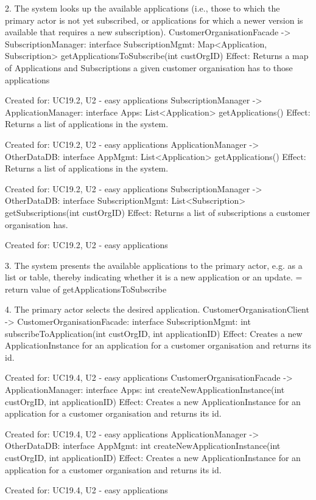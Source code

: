 {{{            2. The system looks up the available applications (i.e., those to which the primary actor is not yet subscribed,
               or applications for which a newer version is available that requires a new subscription).
                    CustomerOrganisationFacade -> SubscriptionManager: interface SubscriptionMgmt: Map<Application, Subscription> getApplicationsToSubscribe(int custOrgID)
                        Effect: Returns a map of Applications and Subscriptions a given customer organisation has to those applications
                        \item Created for: UC19.2, U2 - easy applications
                    SubscriptionManager -> ApplicationManager:            interface Apps:             List<Application> getApplications()
                        Effect: Returns a list of applications in the system.
                        \item Created for: UC19.2, U2 - easy applications
                    ApplicationManager -> OtherDataDB:                    interface AppMgmt:          List<Application> getApplications()
                        Effect: Returns a list of applications in the system.
                        \item Created for: UC19.2, U2 - easy applications
                    SubscriptionManager -> OtherDataDB:                   interface SubscriptionMgmt: List<Subscription> getSubscriptions(int custOrgID)
                        Effect: Returns a list of subscriptions a customer organisation has.
                        \item Created for: UC19.2, U2 - easy applications

            3. The system presents the available applications to the primary actor, e.g. as a list or table,
               thereby indicating whether it is a new application or an update.
                    = return value of getApplicationsToSubscribe

            4. The primary actor selects the desired application.
                    CustomerOrganisationClient -> CustomerOrganisationFacade: interface SubscriptionMgmt: int subscribeToApplication(int custOrgID, int applicationID)
                        Effect: Creates a new ApplicationInstance for an application for a customer organisation and returns its id.
                        \item Created for: UC19.4, U2 - easy applications
                    CustomerOrganisationFacade -> ApplicationManager:         interface Apps:             int createNewApplicationInstance(int custOrgID, int applicationID)
                        Effect: Creates a new ApplicationInstance for an application for a customer organisation and returns its id.
                        \item Created for: UC19.4, U2 - easy applications
                    ApplicationManager -> OtherDataDB:                        interface AppMgmt:          int createNewApplicationInstance(int custOrgID, int applicationID)
                        Effect: Creates a new ApplicationInstance for an application for a customer organisation and returns its id.
                        \item Created for: UC19.4, U2 - easy applications

}}}
